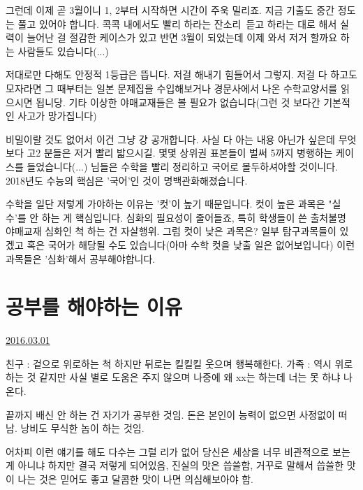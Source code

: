 그런데 이제 곧 3월이니 1, 2부터 시작하면 시간이 주욱 밀리죠.
지금 기출도 중간 정도는 풀고 있어야 합니다.
콕콕 내에서도 빨리 하라는 잔소리 듣고 하라는 대로 해서 실력이 늘어난 걸 절감한 케이스가 있고
반면 3월이 되었는데 이제 와서 저거 할까요 하는 사람들도 있습니다(...)
\vspace{5mm}

저대로만 다해도 안정적 1등급은 뜹니다. 저걸 해내기 힘들어서 그렇지.
저걸 다 하고도 모자라면 그 때부터는 일본 문제집을 수입해보거나 경문사에서 나온 수학교양서를 읽으시면 됩니당.
기타 이상한 야매교재들은 볼 필요가 없습니다(그런 것 보다간 기본적인 사고가 망가집니다)
\vspace{5mm}

비밀이랄 것도 없어서 이건 그냥 걍 공개합니다. 사실 다 아는 내용 아닌가 싶은데
무엇보다 고2 분들은 저거 빨리 밟으시길. 몇몇 상위권 표본들이 벌써 5까지 병행하는 케이스를 들었습니다(...)
님들은 수학을 빨리 정리하고 국어로 몰두하셔야할 것이니다. 2018년도 수능의 핵심은 '국어'인 것이 명백관화해졌습니다.
\vspace{5mm}

수학을 일단 저렇게 가야하는 이유는 '컷'이 높기 때문입니다.
컷이 높은 과목은 "실수'를 안 하는 게 핵심입니다. 심화의 필요성이 줄어들죠, 특히 학생들이 쓴 출처불명 야매교재 심화인 척 하는 건 자살행위.
그럼 컷이 낮은 과목은? 일부 탐구과목들이 있겠고 혹은 국어가 해당될 수도 있습니다(아마 수학 컷을 낮출 일은 없어보입니다)
이런 과목들은 '심화'해서 공부해야합니다.
\vspace{5mm}









\section{공부를 해야하는 이유}
\href{https://www.kockoc.com/Apoc/658157}{2016.03.01}

\vspace{5mm}

친구 : 겉으로 위로하는 척 하지만 뒤로는 킬킬킬 웃으며 행복해한다.
가족 : 역시 위로하는 것 같지만 사실 별로 도움은 주지 않으며 나중에 왜 xx는 하는데 너는 못 하냐 나온다.
\vspace{5mm}

끝까지 배신 안 하는 건 자기가 공부한 것임.
돈은 본인이 능력이 없으면 사정없이 떠남.
낭비도 무식한 놈이 하는 것임.
\vspace{5mm}

어차피 이런 얘기를 해도 다수는 그럴 리가 없어
당신은 세상을 너무 비관적으로 보는 게 아니냐 하지만
결국 저렇게 되어있음, 진실의 맛은 씁쓸함,
거꾸로 말해서 씁쓸한 맛이 나는 것은 믿어도 좋고
달콤한 맛이 나면 의심해보아야 함.
\vspace{5mm}

